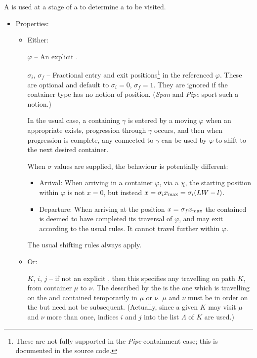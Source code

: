A  is used at a stage of a  to determine a  to be visited.
\begin{itemize}
\item Properties:

  \begin{itemize}
  
  \item Either:
  
  $\varphi$ -- An explicit .

  $\sigma_i$, $\sigma_f$ -- Fractional entry and exit
  positions\footnote{These are not fully supported in
  the \emph{Pipe}-containment case; this is documented in the source code. } in the referenced 
  $\varphi$. These are optional and default to $\sigma_i=0$,
  $\sigma_f=1$.  They are ignored if the container type has no notion
  of position.  (\emph{Span} and \emph{Pipe} sport such a notion.)
  
  In the usual case, a containing  $\gamma$ is entered by a
      moving  $\varphi$ when an appropriate 
      exists, progression through $\gamma$ occurs, and then when
      progression is complete, any  connected to $\gamma$
      can be used by $\varphi$ to shift to the next desired container.

  When $\sigma$ values are supplied, the behaviour is potentially
  different:
  \begin{itemize}
  \item Arrival:
    When arriving in a container  $\varphi$, via a
     $\chi$, the starting position within $\varphi$ is not
    $x=0$, but instead $x = \sigma_i x_\textup{max} = \sigma_i (LW-l)$.
\item Departure:
  When arriving at the position $x = \sigma_f x_\textup{max}$
  the contained  is deemed to have completed its traversal of $\varphi$,
  and may exit according to the usual rules. It cannot travel further within $\varphi$.
  \end{itemize}          
  The usual  shifting rules always apply.
  
  \item Or:

  $K$, $i$, $j$ -- if not an explicit , then this specifies any 
  travelling on path $K$, from container  $\mu$ to  $\nu$.
  The  described by the  is the one which is 
  travelling on the  and contained temporarily in $\mu$ or $\nu$.
  $\mu$ and $\nu$ must be in order on the  but need not be subsequent.
  (Actually, since a given  $K$ may visit $\mu$ and $\nu$ more than once,
  indices $i$ and $j$ into the list ${\Lambda}$ of $K$ are used.)
  

  \end{itemize}
\end{itemize}

